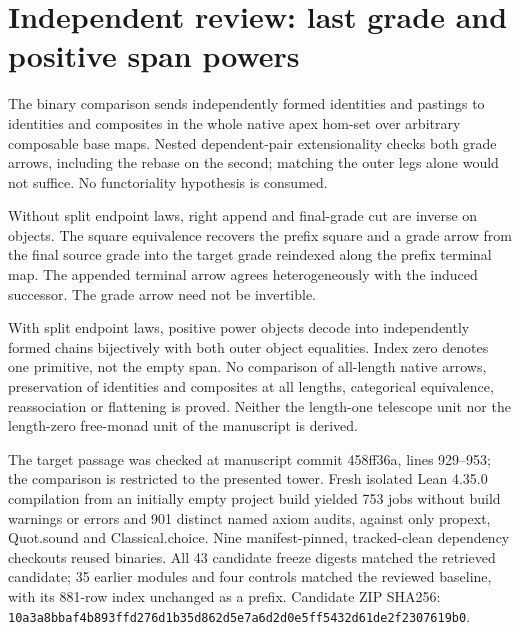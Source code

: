 \documentclass{article}
\begin{document}
\section*{Independent review: last grade and positive span powers}
The binary comparison sends independently formed identities and pastings to identities and composites in the whole native apex hom-set over arbitrary composable base maps. Nested dependent-pair extensionality checks both grade arrows, including the rebase on the second; matching the outer legs alone would not suffice. No functoriality hypothesis is consumed.
\par Without split endpoint laws, right append and final-grade cut are inverse on objects. The square equivalence recovers the prefix square and a grade arrow from the final source grade into the target grade reindexed along the prefix terminal map. The appended terminal arrow agrees heterogeneously with the induced successor. The grade arrow need not be invertible.
\par With split endpoint laws, positive power objects decode into independently formed chains bijectively with both outer object equalities. Index zero denotes one primitive, not the empty span. No comparison of all-length native arrows, preservation of identities and composites at all lengths, categorical equivalence, reassociation or flattening is proved. Neither the length-one telescope unit nor the length-zero free-monad unit of the manuscript is derived.
\par The target passage was checked at manuscript commit 458ff36a, lines 929--953; the comparison is restricted to the presented tower. Fresh isolated Lean 4.35.0 compilation from an initially empty project build yielded 753 jobs without build warnings or errors and 901 distinct named axiom audits, against only propext, Quot.sound and Classical.choice. Nine manifest-pinned, tracked-clean dependency checkouts reused binaries. All 43 candidate freeze digests matched the retrieved candidate; 35 earlier modules and four controls matched the reviewed baseline, with its 881-row index unchanged as a prefix. Candidate ZIP SHA256: \texttt{10a3a8bbaf4b893ffd276d1b35d862d5e7a6d2d0e5ff5432d61de2f2307619b0}.
\end{document}

